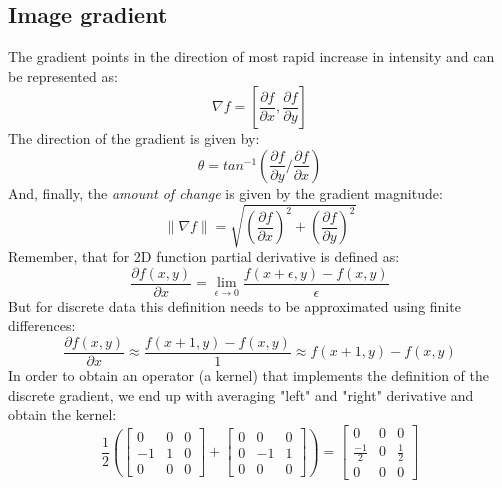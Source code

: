 \subsection{Image gradient}
The gradient points in the direction of most rapid increase in intensity and can be represented as:
\begin{equation}
	\nabla f = [\frac{\partial f}{\partial x}, \frac{\partial f}{\partial y}]
\end{equation}
The direction of the gradient is given by:
\begin{equation}
	\theta = tan^{-1}(\frac{\partial f}{\partial y} / \frac{\partial f}{\partial x})
\end{equation}
And, finally, the \textit{amount of change} is given by the gradient magnitude:
\begin{equation}
	\parallel \nabla f \parallel = \sqrt{(\frac{\partial f}{\partial x})^2 + (\frac{\partial f}{\partial y})^2}
\end{equation}
Remember, that for 2D function partial derivative is defined as:
\begin{equation}
	\frac{\partial f(x,y)}{\partial x} = \lim_{\epsilon \to 0} \frac{f(x + \epsilon, y) - f(x, y)}{\epsilon}
\end{equation}
But for discrete data this definition needs to be approximated using finite differences:
\begin{equation}
	\frac{\partial f(x,y)}{\partial x} \approx \frac{f(x + 1, y) - f(x, y)}{1} \approx f(x + 1, y) - f(x, y)
\end{equation}
In order to obtain an operator (a kernel) that implements the definition of the discrete gradient, we end up with averaging "left" and "right" derivative and obtain the kernel:
\[
\frac{1}{2}
(\begin{bmatrix}
    0 & 0 & 0 \\
    -1 & 1 & 0 \\
    0 & 0 & 0
\end{bmatrix}
+
\begin{bmatrix}
    0 & 0 & 0 \\
    0 & -1 & 1 \\
    0 & 0 & 0
\end{bmatrix})
=
\begin{bmatrix}
    0 & 0 & 0 \\
    \frac{-1}{2} & 0 & \frac{1}{2} \\
    0 & 0 & 0
\end{bmatrix}
\]

